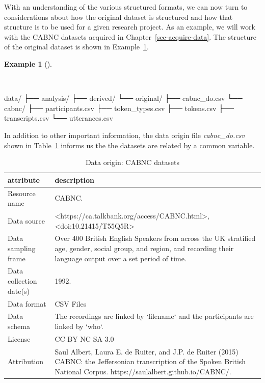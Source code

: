 \documentclass[
  letterpaper,
  DIV=11,
  numbers=noendperiod]{scrreport}
\newenvironment{Shaded}{\begin{snugshade}}{\end{snugshade}}
\newcommand{\ExtensionTok}[1]{\textcolor[rgb]{0.00,0.00,0.00}{#1}}
\newcommand{\NormalTok}[1]{\textcolor[rgb]{0.00,0.00,0.00}{#1}}
\theoremstyle{definition}
\newtheorem{example}{Example}[chapter]
\theoremstyle{remark}
\begin{document}
With an understanding of the various structured formats, we can now turn
to considerations about how the original dataset is structured and how
that structure is to be used for a given research project. As an
example, we will work with the CABNC datasets acquired in
Chapter~\ref{sec-acquire-data}. The structure of the original dataset is
shown in Example~\ref{exm-cd-cabnc-structure}.

\begin{example}[]\protect\hypertarget{exm-cd-cabnc-structure}{}\label{exm-cd-cabnc-structure}

~

\begin{Shaded}
\begin{Highlighting}[]
\ExtensionTok{data/}
\ExtensionTok{├──}\NormalTok{ analysis/}
\ExtensionTok{├──}\NormalTok{ derived/}
\ExtensionTok{└──}\NormalTok{ original/}
    \ExtensionTok{├──}\NormalTok{ cabnc\_do.csv}
    \ExtensionTok{└──}\NormalTok{ cabnc/}
        \ExtensionTok{├──}\NormalTok{ participants.csv}
        \ExtensionTok{├──}\NormalTok{ token\_types.csv}
        \ExtensionTok{├──}\NormalTok{ tokens.csv}
        \ExtensionTok{├──}\NormalTok{ transcripts.csv}
        \ExtensionTok{└──}\NormalTok{ utterances.csv}
\end{Highlighting}
\end{Shaded}

\end{example}

In addition to other important information, the data origin file
\emph{cabnc\_do.csv} shown in Table~\ref{tbl-cd-cabnc-do} informs us the
the datasets are related by a common variable.

\hypertarget{tbl-cd-cabnc-do}{}
\begin{table}
\caption{\label{tbl-cd-cabnc-do}Data origin: CABNC datasets }\tabularnewline

\centering
\begin{tabular}{l|l}
\hline
attribute & description\\
\hline
Resource name & CABNC.\\
\hline
Data source & <https://ca.talkbank.org/access/CABNC.html>, <doi:10.21415/T55Q5R>\\
\hline
Data sampling frame & Over 400 British English Speakers from across the UK stratified age, gender, social group, and region, and recording their language output over a set period of time.\\
\hline
Data collection date(s) & 1992.\\
\hline
Data format & CSV Files\\
\hline
Data schema & The recordings are linked by `filename` and the participants are linked by `who`.\\
\hline
License & CC BY NC SA 3.0\\
\hline
Attribution & Saul Albert, Laura E. de Ruiter, and J.P. de Ruiter (2015) CABNC: the Jeffersonian transcription of the Spoken British National Corpus. https://saulalbert.github.io/CABNC/.\\
\hline
\end{tabular}
\end{table}
\end{document}
